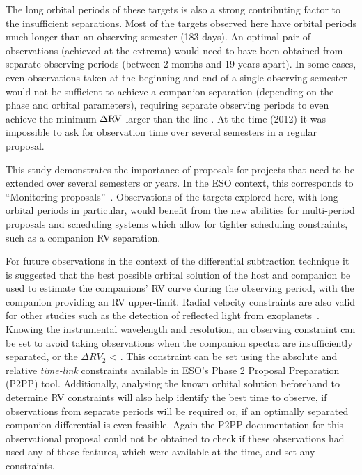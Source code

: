 The long orbital periods of these targets is also a strong contributing factor to the insufficient separations.
Most of the targets observed here have orbital periods much longer than an observing semester (183 days).
An optimal pair of observations (achieved at the extrema) would need to have been obtained from separate observing periods (between 2 months and 19 years apart).
In some cases, even observations taken at the beginning and end of a single observing semester would not be sufficient to achieve a companion separation (depending on the phase and orbital parameters), requiring separate observing periods to even achieve the minimum \(\Delta \rm {RV}\) larger than the line {\fwhm}.
At the time (2012) it was impossible to ask for observation time over several semesters in a regular proposal.

This study demonstrates the importance of proposals for projects that need to be extended over several semesters or years.
In the {ESO} context, this corresponds to ``Monitoring proposals''~\citep[e.g.][pg.~18]{eso_eso_2017}.
Observations of the targets explored here, with long orbital periods in particular, would benefit from the new abilities for multi-period proposals and scheduling systems which allow for tighter scheduling constraints, such as a companion {RV} separation.

For future observations in the context of the differential subtraction technique it is suggested that the best possible orbital solution of the host and companion be used to estimate the companions' {RV} curve during the observing period, with the companion \Mtwosini{} providing an {RV} upper-limit.
Radial velocity constraints are also valid for other studies such as the detection of reflected light from exoplanets~\cite[e.g.]{martins_evidence_2015}.
Knowing the instrumental wavelength and resolution, an observing constraint can be set to avoid taking observations when the companion spectra are insufficiently separated, or the \(\Delta {RV}_2\) < {\fwhm}.
This constraint can be set using the absolute and relative \emph{time-link} constraints available in {ESO}'s {Phase 2 Proposal Preparation} (P2PP) tool.
Additionally, analysing the known orbital solution beforehand to determine {RV} constraints will also help identify the best time to observe, if observations from separate periods will be required or, if an optimally separated companion differential is even feasible.
Again the P2PP documentation for this observational proposal could not be obtained to check if these observations had used any of these features, which were available at the time, and set any constraints.

